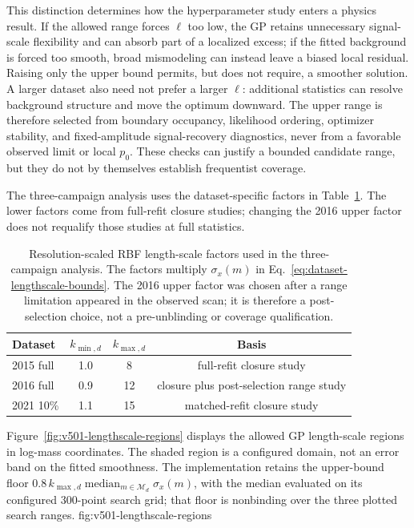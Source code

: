 This distinction determines how the hyperparameter study enters a physics result.
If the allowed range forces $\ell$ too low, the GP retains unnecessary
signal-scale flexibility and can absorb part of a localized excess; if the fitted
background is forced too smooth, broad mismodeling can instead leave a biased local
residual. Raising only the upper bound permits, but does not require, a smoother
solution. A larger dataset also need not prefer a larger $\ell$: additional
statistics can resolve background structure and move the optimum downward. The
upper range is therefore selected from boundary occupancy, likelihood ordering,
optimizer stability, and fixed-amplitude signal-recovery diagnostics, never from a
favorable observed limit or local $p_0$. These checks can justify a bounded candidate
range, but they do not by themselves establish frequentist coverage.

The three-campaign analysis uses the dataset-specific factors in
Table~\ref{tab:production-lengthscale-bounds}. The lower factors come from full-refit
closure studies; changing the 2016 upper factor does not requalify those studies at
full statistics.

\begin{table}[H]
\centering
\begin{tabular}{lccc}
\toprule
Dataset & $k_{\min,d}$ & $k_{\max,d}$ & Basis \\
\midrule
2015 full & 1.0 & 8 & full-refit closure study \\
2016 full & 0.9 & 12 & closure plus post-selection range study \\
2021 10\% & 1.1 & 15 & matched-refit closure study \\
\bottomrule
\end{tabular}
\caption{Resolution-scaled RBF length-scale factors used in the three-campaign
analysis. The factors multiply $\sigma_x(m)$ in
Eq.~\eqref{eq:dataset-lengthscale-bounds}. The 2016 upper factor was chosen after a
range limitation appeared in the observed scan; it is therefore a post-selection
choice, not a pre-unblinding or coverage qualification.}
\label{tab:production-lengthscale-bounds}
\end{table}

Figure~\ref{fig:v501-lengthscale-regions} displays the allowed GP length-scale
regions in log-mass coordinates. The shaded region is a configured domain, not
an error band on the fitted smoothness. The implementation retains the upper-bound
floor $0.8\,k_{\max,d}\operatorname{median}_{m\in\mathcal M_d}\sigma_x(m)$,
with the median evaluated on its configured 300-point search grid; that floor is
nonbinding over the three plotted search ranges.
{fig:v501-lengthscale-regions}


